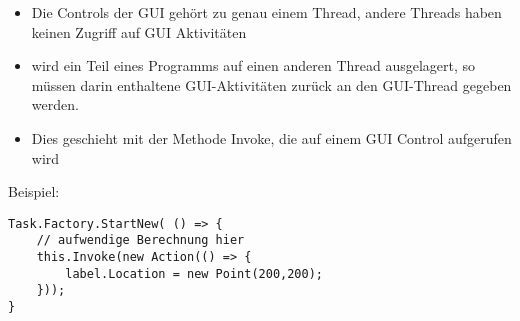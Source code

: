\begin{itemize}
\item Die Controls der GUI gehört zu genau einem Thread, andere Threads haben keinen Zugriff auf GUI Aktivitäten
\item wird ein Teil eines Programms auf einen anderen Thread ausgelagert, so müssen darin enthaltene GUI-Aktivitäten zurück an den GUI-Thread gegeben werden. 
\item Dies geschieht mit der Methode Invoke, die auf einem GUI Control aufgerufen wird
\end{itemize}
Beispiel:
\begin{lstlisting}[language={[Sharp]C}]
Task.Factory.StartNew( () => {
	// aufwendige Berechnung hier
	this.Invoke(new Action(() => {
		label.Location = new Point(200,200);
	}));
}
\end{lstlisting}
